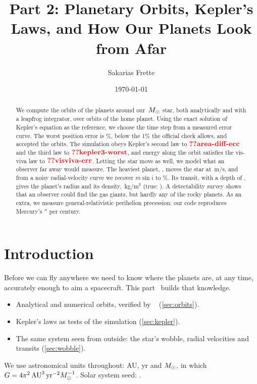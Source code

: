 \documentclass[aps,prd,twocolumn,nofootinbib,floatfix,superscriptaddress]{revtex4-2}
\begin{document}
\title{Part 2: Planetary Orbits, Kepler's Laws, and How Our Planets Look from Afar}
\author{Sakarias Frette}
\date{\today}

\begin{abstract}
We compute the orbits of the  planets around our \,$M_\odot$ star, both analytically and with a leapfrog integrator, over  orbits of the home planet.
Using the exact solution of Kepler's equation as the reference, we choose the time step from a measured error curve.
The worst position error is \%, below the 1\% the official check allows, and  accepted the orbits.
The simulation obeys Kepler's second law to $\val{area-diff-ecc}$ and the third law to $\val{kepler3-worst}$, and energy along the orbit satisfies the vis-viva law to $\val{visviva-err}$.
Letting the star move as well, we model what an observer far away would measure.
The heaviest planet, , moves the star at \,m/s, and from a noisy radial-velocity curve we recover $m\sin i$ to \%.
Its transit, with a depth of , gives the planet's radius and its density, \,kg/m$^3$ (true: ).
A detectability survey shows that an observer could find the gas giants, but hardly any of the rocky planets.
As an extra, we measure general-relativistic perihelion precession: our code reproduces Mercury's $''$ per century.
\end{abstract}

\maketitle

\section{Introduction}
Before we can fly anywhere we need to know where the planets are, at any time, accurately enough to aim a spacecraft.
This part~\cite{ast2000project} builds that knowledge.
\begin{itemize}
\item Analytical and numerical orbits, verified by ~\cite{ast2000tools} (\cref{sec:orbits}).
\item Kepler's laws as tests of the simulation (\cref{sec:kepler}).
\item The same system seen from outside: the star's wobble, radial velocities and transits (\cref{sec:wobble}).
\end{itemize}
We use astronomical units throughout: AU, yr and $M_\odot$, in which $G=4\pi^2\,\mathrm{AU}^3\,\mathrm{yr}^{-2}M_\odot^{-1}$.
Solar system seed: .
\end{document}
